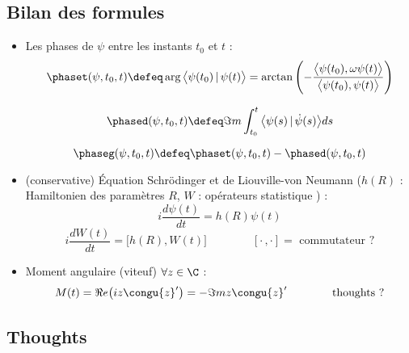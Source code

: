 \subsection{Bilan des formules}

\begin{itemize}
	\item Les phases de $\psi$ entre les instants $t_0$ et $t$ :
	\begin{equation}\label{eq:phase_tot}
		\phaset(\psi, t_0, t) \defeq \arg\big\langle\psi(t_0) \,|\, \psi(t)\big\rangle = \arctan \left( -\frac{\big\langle\psi(t_0), \omega\psi(t)\big\rangle}{\big\langle\psi(t_0), \psi(t)\big\rangle} \right)
	\end{equation}
	
	\begin{equation}\label{eq:phase_dyn}
		\phased(\psi,t_0,t) \defeq \Im m \int_{t_0}^t\big\langle \psi(s) \,|\, \dot{\psi}(s) \big\rangle ds
	\end{equation}
	
	\begin{equation}\label{eq:phase_geo}
		\phaseg(\psi, t_0, t) \defeq \phaset(\psi, t_0, t) - \phased(\psi,t_0,t)
	\end{equation}
	
	\item (conservative) Équation Schrödinger et de Liouville-von Neumann ($h(R)$ : Hamiltonien des paramètres $R$, $W$ : opérateurs statistique ) \cite[p.6]{bohm_geometric_2003} :
	\begin{equation}\label{eq:schrodinger}
		i\frac{d \psi(t)}{dt} = h(R)\psi(t)
	\end{equation}
	\begin{equation}\label{eq:liouville-neumann}
		i\frac{d W(t)}{dt} = \big[h(R),W(t)\big] \qquad\qquad [\cdot\,,\cdot]=\text{ commutateur ?}
	\end{equation}
	
	\item Moment angulaire (viteuf) $\forall z\in\C$ :
	\begin{equation}\label{eq:mom_angu}
		M(t) = \Re e \big(iz\congu{z}'\big) = -\Im m z\congu{z}'  \qquad\qquad \text{thoughts ?}
	\end{equation}
	
\end{itemize}


\subsection{Thoughts}

